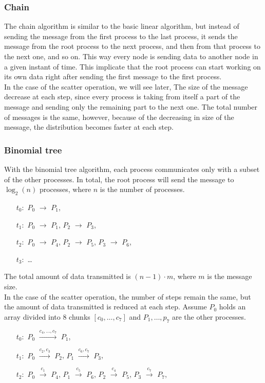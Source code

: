 \subsubsection{Chain}
    The chain algorithm is similar to the basic linear algorithm, but
    instead of sending the message from the first process to the last
    process, it sends the message from the root process to the next
    process, and then from that process to the next one, and so on.
    This way every node is sending data to another node in a given
    instant of time. This implicate that the root process can start
    working on its own data right after sending the first message to
    the first process. \\
    In the case of the scatter operation, we will see later,
    The size of the message decrease at each step, since every
    process is taking from itself a part of the message and sending
    only the remaining part to the next one. The total number of messages
    is the same, however, because of the decreasing in size of the
    message, the distribution becomes faster at each step. 

\subsubsection{Binomial tree}
    With the binomial tree algorithm, each process communicates
    only with a subset of the other processes. In total, the root
    process will send the message to $\log_2(n)$ processes, where
    $n$ is the number of processes. 
    \begin{enumerate}
        \item[$t_0:$] $P_0$ $\rightarrow$ $P_1$,
        \item[$t_1:$] $P_0$ $\rightarrow$ $P_1$, $P_2$ $\rightarrow$ $P_3$,
        \item[$t_2:$] $P_0$ $\rightarrow$ $P_4$, $P_2$ $\rightarrow$ $P_5$, $P_3$ $\rightarrow$ $P_6$,
        \item[$t_3:$] \dots
    \end{enumerate}
    The total amount of data transmitted is $(n-1) \cdot m$, where
    $m$ is the message size. \\
    In the case of the scatter operation, the number of steps
    remain the same, but the amount of data transmitted
    is reduced at each step. Assume $P_0$ holds an array divided
    into $8$ chunks $[ c_0, \dots, c_7 ]$ and $P_1, \dots, p_7$ are
    the other processes.
    \begin{enumerate}
        \item[$t_0:$] $P_0$ $\xrightarrow{c_4,\dots,c_7}$ $P_1$,
        \item[$t_1:$] $P_0$ $\xrightarrow{c_2,c_3}$ $P_2$, $P_1$ $\xrightarrow{c_6,c_7}$ $P_3$,
        \item[$t_2:$] $P_0$ $\xrightarrow{c_1}$ $P_4$, $P_1$ $\xrightarrow{c_5}$ $P_6$, $P_2$ $\xrightarrow{c_4}$ $P_5$, $P_3$ $\xrightarrow{c_7}$ $P_7$,
    \end{enumerate}


